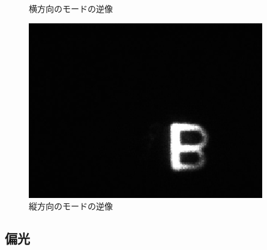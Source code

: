 \documentclass[11pt,a4]{jarticle}
\begin{document}
\begin{figure}[htbp]
\begin{minipage}{0.33\hsize}
\begin{center}
    \caption{横方向のモードの逆像}
     \label{fig:B}
   \end{center}
 \end{minipage}
  \begin{minipage}{0.33\hsize}
   \begin{center}
    \includegraphics[width=0.9\hsize]{./B.eps}
    \caption{縦方向のモードの逆像}
     \label{fig:B}
   \end{center}
 \end{minipage}
\end{figure}

\subsection{偏光}
\end{document}
